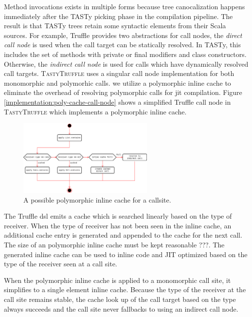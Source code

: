 Method invocations exists in multiple forms because tree canocalization happens immediately after the TASTy picking phase in the compilation pipeline.
The result is that TASTy trees retain some syntactic elements from their Scala sources. 
For example, Truffle provides two abstractions for call nodes, the \textit{direct call node} is used when the call target can be statically resolved. 
In TASTy, this includes the set of methods with private or final modifiers\cite{java:lang-spec} and class constructors. 
Otherwise, the \textit{indirect call node} is used for calls which have dynamically resolved call targets. 
\textsc{TastyTruffle} uses a singular call node implementation for both monomorphic and polymorhic calls. 
we utilize a polymorphic inline cache\cite{self:polymorphic-inline-caches} to eliminate the overhead of resolving polymorphic calls for \acrshort{jit} compilation. 
Figure \ref{implementation:poly-cache-call-node} shows a simplified Truffle call node in \textsc{TastyTruffle} which implements a polymorphic inline cache.

\begin{figure}[!htb]
	\centering
	\includegraphics[width=0.6\textwidth]{figures/tastytruffle-pic-example.png}
	\caption{A possible polymorphic inline cache for a  callsite.}
	\label{example:poly-cache-call-node}
\end{figure}

The Truffle \acrshort{dsl} emits a cache which is searched linearly based on the type of receiver. 
When the type of receiver has not been seen in the inline cache, an additional cache entry is generated and appended to the cache for the next call. 
The size of an polymorphic inline cache must be kept reasonable ???. 
The generated inline cache can be used to inline code and JIT optimized based on the type of the receiver seen at a call site. 

When the polymorphic inline cache is applied to a monomorphic call site, it simplifies to a single element inline cache\cite{smalltalk:inline-caches}. 
Because the type of the receiver at the call site remains stable, the cache look up of the call target based on the type always succeeds and the call site never fallbacks to using an indirect call node.

